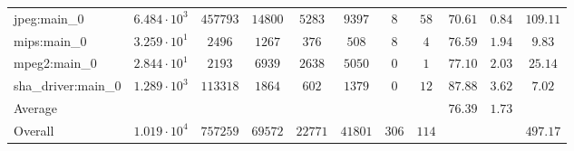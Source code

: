 \begin{tabular}{|l|c|c|c|c|c|c|c|c|c|c|}
jpeg:main\_0            & $ 6.484 \cdot 10^{3} $ & $ 457793 $ & $ 14800 $ & $ 5283  $ & $ 9397  $ & $ 8   $ & $ 58  $ & $ 70.61       $ & $ 0.84    $ & $ 109.11  $ \\
mips:main\_0            & $ 3.259 \cdot 10^{1} $ & $ 2496   $ & $ 1267  $ & $ 376   $ & $ 508   $ & $ 8   $ & $ 4   $ & $ 76.59       $ & $ 1.94    $ & $ 9.83    $ \\
mpeg2:main\_0           & $ 2.844 \cdot 10^{1} $ & $ 2193   $ & $ 6939  $ & $ 2638  $ & $ 5050  $ & $ 0   $ & $ 1   $ & $ 77.10       $ & $ 2.03    $ & $ 25.14   $ \\
sha\_driver:main\_0     & $ 1.289 \cdot 10^{3} $ & $ 113318 $ & $ 1864  $ & $ 602   $ & $ 1379  $ & $ 0   $ & $ 12  $ & $ 87.88       $ & $ 3.62    $ & $ 7.02    $ \\
\hline
Average                 & $                    $ & $        $ & $       $ & $       $ & $       $ & $     $ & $     $ & $ 76.39       $ & $ 1.73    $ & $         $ \\
\hline
Overall                 & $ 1.019 \cdot 10^{4} $ & $ 757259 $ & $ 69572 $ & $ 22771 $ & $ 41801 $ & $ 306 $ & $ 114 $ & $             $ & $         $ & $ 497.17  $ \\
\hline
\end{tabular}

